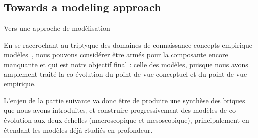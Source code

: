 \subsection*{Towards a modeling approach}{Vers une approche de modélisation}


En se raccrochant au triptyque des domaines de connaissance concepts-empirique-modèles~\cite{livet2010}, nous pouvons considérer être armés pour la composante encore manquante et qui est notre objectif final : celle des modèles, puisque nous avons amplement traité la co-évolution du point de vue conceptuel et du point de vue empirique. 


L'enjeu de la partie suivante va donc être de produire une synthèse des briques que nous avons introduites, et construire progressivement des modèles de co-évolution aux deux échelles (macroscopique et mesoscopique), principalement en étendant les modèles déjà étudiés en profondeur.












